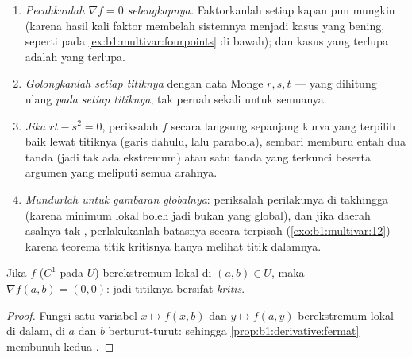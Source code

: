 \begin{method}
\label{met:b1:multivar:extremamethod}
\begin{enumerate}
  \item \emph{Pecahkanlah $\nabla f = 0$ selengkapnya.} Faktorkanlah setiap
         kapan pun mungkin (karena hasil kali faktor 
        membelah sistemnya menjadi kasus yang bening, seperti pada
        \cref{ex:b1:multivar:fourpoints} di bawah); dan kasus yang terlupa
        adalah  yang terlupa.
  \item \emph{Golongkanlah setiap titiknya} dengan data Monge $r, s,
        t$ --- yang dihitung ulang \emph{pada setiap titiknya}, tak pernah sekali untuk
        semuanya.
  \item \emph{Jika $rt - s^2 = 0$}, periksalah $f$ secara langsung sepanjang
        kurva yang terpilih baik lewat titiknya (garis dahulu, lalu
        parabola), sembari memburu entah dua tanda (jadi tak ada ekstremum)
        atau satu tanda yang terkunci beserta argumen yang meliputi semua
        arahnya.
  \item \emph{Mundurlah untuk gambaran globalnya}: periksalah
        perilakunya di takhingga (karena minimum lokal boleh jadi bukan yang global),
        dan jika daerah asalnya tak , perlakukanlah batasnya
        secara terpisah (\cref{exo:b1:multivar:12}) --- karena teorema titik
        kritisnya hanya melihat titik dalamnya.
\end{enumerate}
\end{method}

\begin{theorem}\label{thm:b1:multivar:critical}
Jika $f$ ($C^1$ pada  $U$) berekstremum lokal di $(a,b)
\in U$, maka $\nabla f(a,b) = (0,0)$: jadi titiknya bersifat
\emph{kritis}.
\end{theorem}

\begin{proof}
Fungsi satu variabel $x \mapsto f(x, b)$ dan $y \mapsto f(a,
y)$ berekstremum lokal di dalam, di $a$ dan $b$ berturut-turut:
sehingga \cref{prop:b1:derivative:fermat} membunuh kedua .
\end{proof}

